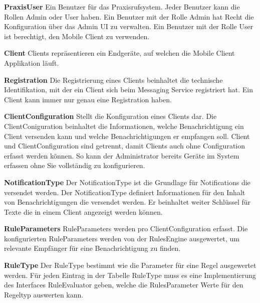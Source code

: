 \textbf{PraxisUser}
Ein Benutzer für das Praxisrufsystem.
Jeder Benutzer kann die Rollen Admin oder User haben.
Ein Benutzer mit der Rolle Admin hat Recht die Konfiguration über das Admin UI zu verwalten.
Ein Benutzer mit der Rolle User ist berechtigt, den Mobile Client zu verwenden.

\textbf{Client}
Clients repräsentieren ein Endgeräte, auf welchen die Mobile Client Applikation läuft.

\textbf{Registration}
Die Registrierung eines Clients beinhaltet die technische Identifikation, mit der ein Client sich beim Messaging Service registriert hat.
Ein Client kann immer nur genau eine Registration haben.

\textbf{ClientConfiguration}
Stellt die Konfiguration eines Clients dar.
Die ClientConiguration beinhaltet die Informationen, welche Benachrichtigung ein Client versenden kann und welche Benachrichtigungen er empfangen soll.
Client und ClientConfiguration sind getrennt, damit Clients auch ohne Configuration erfasst werden können.
So kann der Administrator bereits Geräte im System erfassen ohne Sie vollständig zu konfigurieren.

\textbf{NotificationType}
Der NotificationType ist die Grundlage für Notifications die versendet werden.
Der NotificationType definiert Informationen für den Inhalt von Benachrichtigungen die versendet werden.
Er beinhaltet weiter Schlüssel für Texte die in einem Client angezeigt werden können.

\textbf{RuleParameters}
RuleParameters werden pro ClientConfiguration erfasst.
Die konfigurierten RuleParameters werden von der RulesEngine ausgewertet, um relevante Empfänger für eine Benachrichtigung zu finden.

\textbf{RuleType}
Der RuleType bestimmt wie die Parameter für eine Regel ausgewertet werden.
Für jeden Eintrag in der Tabelle RuleType muss es eine Implementierung des Interfaces RuleEvaluator geben, welche die RulesParameter Werte für den Regeltyp auswerten kann.

